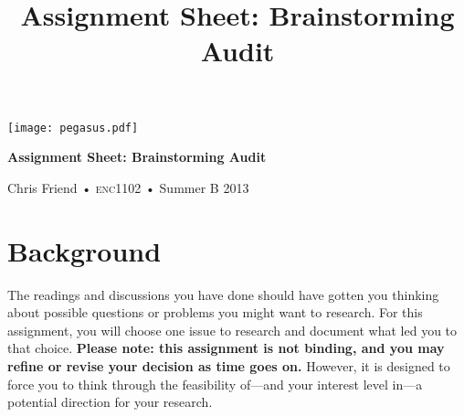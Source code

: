 \documentclass[12pt,oneside]{amsart}	%
\title[Brainstorming Audit]{Assignment Sheet: Brainstorming Audit}
\begin{document}
%
\thispagestyle{empty}

\vspace{-2in}
\begin{center}
\huge
{\texttt{[image: pegasus.pdf]}}

\textbf{Assignment Sheet: Brainstorming Audit}

{\normalsize Chris Friend • \textsc{enc1102} • Summer B 2013}
\end{center}
\vspace{1.5\baselineskip}

\section{Background} %
\label{sec:background}
The readings and discussions you have done should have gotten you thinking about possible questions or problems you might want to research. For this assignment, you will choose one issue to research and document what led you to that choice. \textbf{Please note: this assignment is not binding, and you may refine or revise your decision as time goes on.} However, it is designed to force you to think through the feasibility of—and your interest level in—a potential direction for your research.
\end{document}
